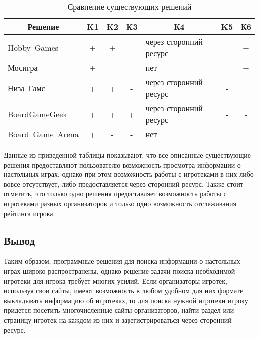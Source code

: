 \begin{table}[ht!]
\captionsetup{format=hang,justification=raggedright,
              singlelinecheck=off,width=13.5cm}
\centering
\caption{Сравнение существующих решений\label{tab:01}}
\begin{tabular}[Hc]{|p{4cm}|c|c|c|p{3.5cm}|c|c|}
    \hline
    \multicolumn{1}{|c}{\textbf{Решение}} & \multicolumn{1}{|c|}{\textbf{K1}} &
    \multicolumn{1}{c|}{\textbf{K2}} & \multicolumn{1}{c}{\textbf{K3}} &
    \multicolumn{1}{|c|}{\textbf{К4}} & \multicolumn{1}{c|}{\textbf{K5}} &
    \multicolumn{1}{c|}{\textbf{К6}}\\
    \hline
    \mbox{Hobby Games}      & + & + & - & через сторонний ресурс & - & + \\
    \hline                                                           
    \mbox{Мосигра}          & + & - & - & нет                    & - & + \\
    \hline                                                           
    \mbox{Низа Гамс}        & + & + & - & через сторонний ресурс & - & + \\
    \hline                                                           
    \mbox{BoardGameGeek}    & + & + & + & через сторонний ресурс & - & - \\
    \hline                                                           
    \mbox{Board Game Arena} & + & - & - & нет                    & + & + \\
    \hline
\end{tabular}
\end{table}

\clearpage
Данные из приведенной таблицы показывают, что все описанные существующие решения
предоставляют пользователю возможность просмотра информации о настольных играх,
однако при этом возможность работы с игротеками в них либо вовсе отсутствует,
либо предоставляется через сторонний ресурс. Также стоит отметить, что только
одно решения предоставляет возможность работы с игротеками разных организаторов
и только одно возможность отслеживания рейтинга игрока.

\subsection*{Вывод}

Таким образом, программные решения для поиска информации о настольных играх
широко распространены, однако решение задачи поиска необходимой игротеки для
игрока требует многих усилий. Если организаторы игротек, используя свои сайты,
имеют возможность в любом удобном для них формате выкладывать информацию об
игротеках, то для поиска нужной игротеки игроку придется посетить многочисленные
сайты организаторов, найти раздел или страницу игротек на каждом из них и
зарегистрироваться через сторонний ресурс.

